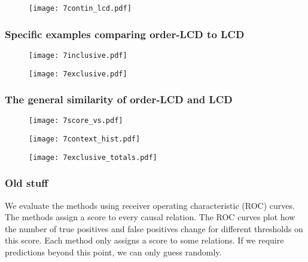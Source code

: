 \begin{figure}[h]
    \centering
    \texttt{[image: 7contin\_lcd.pdf]}
    \caption{}
    \label{fig:7:conlcd}
\end{figure}



\subsubsection{Specific examples comparing order-LCD to LCD}

\begin{figure}[h]
    \centering
    \texttt{[image: 7inclusive.pdf]}
    \caption{}
    \label{fig:7:exincl}
\end{figure}

\begin{figure}[h]
    \centering
    \texttt{[image: 7exclusive.pdf]}
    \caption{}
    \label{fig:7:exexcl}
\end{figure}


\subsubsection{The general similarity of order-LCD and LCD}

\begin{figure}[h]
    \centering
    \texttt{[image: 7score\_vs.pdf]}
    \caption{}
    \label{fig:7:scorevs}
\end{figure}

\begin{figure}[h]
    \centering
    \texttt{[image: 7context\_hist.pdf]}
    \caption{}
    \label{fig:7:contexthist}
\end{figure}

\begin{figure}[h]
    \centering
    \texttt{[image: 7exclusive\_totals.pdf]}
    \caption{}
    \label{fig:7:excltotals}
\end{figure}





\subsubsection{Old stuff}

We evaluate the methods using receiver operating characteristic (ROC) curves. The methods assign a score to every causal relation. The ROC curves plot how the number of true positives and false positives change for different thresholds on this score. Each method only assigns a score to some relations. If we require predictions beyond this point, we can only guess randomly. 


